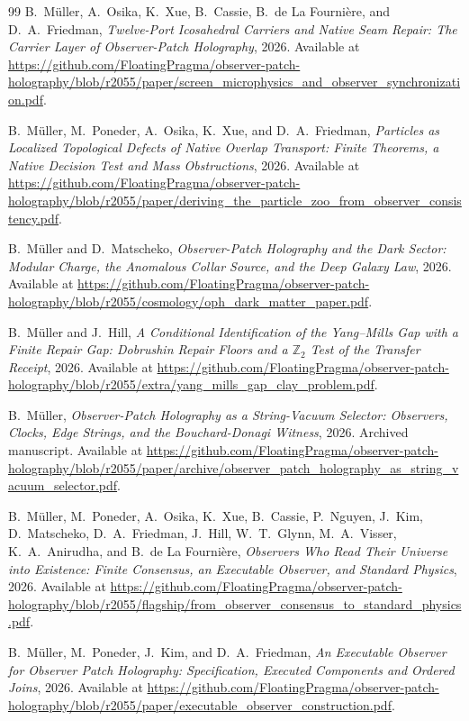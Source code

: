 \begin{thebibliography}{99}
B.~M\"uller, A.~Osika, K.~Xue, B.~Cassie, B.~de La Fourni\`ere, and D.~A.~Friedman,
\emph{Twelve-Port Icosahedral Carriers and Native Seam Repair: The Carrier Layer of Observer-Patch Holography},
2026.
Available at \url{https://github.com/FloatingPragma/observer-patch-holography/blob/r2055/paper/screen_microphysics_and_observer_synchronization.pdf}.

B.~M\"uller, M.~Poneder, A.~Osika, K.~Xue, and D.~A.~Friedman,
\emph{Particles as Localized Topological Defects of Native Overlap Transport: Finite Theorems, a Native Decision Test and Mass Obstructions},
2026.
Available at \url{https://github.com/FloatingPragma/observer-patch-holography/blob/r2055/paper/deriving_the_particle_zoo_from_observer_consistency.pdf}.

B.~M\"uller and D.~Matscheko,
\emph{Observer-Patch Holography and the Dark Sector: Modular Charge,
the Anomalous Collar Source, and the Deep Galaxy Law},
2026.
Available at \url{https://github.com/FloatingPragma/observer-patch-holography/blob/r2055/cosmology/oph_dark_matter_paper.pdf}.

B.~M\"uller and J.~Hill,
\emph{A Conditional Identification of the Yang--Mills Gap with a Finite Repair Gap: Dobrushin Repair Floors and a \(\mathbb Z_2\) Test of the Transfer Receipt},
2026.
Available at \url{https://github.com/FloatingPragma/observer-patch-holography/blob/r2055/extra/yang_mills_gap_clay_problem.pdf}.

B.~M\"uller,
\emph{Observer-Patch Holography as a String-Vacuum Selector: Observers, Clocks, Edge Strings, and the Bouchard-Donagi Witness},
2026. Archived manuscript.
Available at \url{https://github.com/FloatingPragma/observer-patch-holography/blob/r2055/paper/archive/observer_patch_holography_as_string_vacuum_selector.pdf}.

B.~M\"uller, M.~Poneder, A.~Osika, K.~Xue, B.~Cassie, P.~Nguyen, J.~Kim, D.~Matscheko, D.~A.~Friedman, J.~Hill, W.~T.~Glynn, M.~A.~Visser, K.~A.~Anirudha, and B.~de La Fourni\`ere,
\emph{Observers Who Read Their Universe into Existence: Finite Consensus, an Executable Observer, and Standard Physics},
2026.
Available at \url{https://github.com/FloatingPragma/observer-patch-holography/blob/r2055/flagship/from_observer_consensus_to_standard_physics.pdf}.

B.~M\"uller, M.~Poneder, J.~Kim, and D.~A.~Friedman,
\emph{An Executable Observer for Observer Patch Holography: Specification, Executed Components and Ordered Joins},
2026.
Available at \url{https://github.com/FloatingPragma/observer-patch-holography/blob/r2055/paper/executable_observer_construction.pdf}.


\end{thebibliography}
